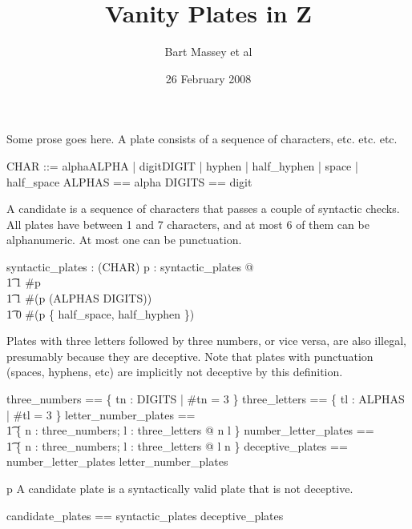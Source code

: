 \documentclass{article}
\title{Vanity Plates in Z}
\author{Bart Massey et al}
\date{26 February 2008}
\begin{document}
\maketitle

Some prose goes here.  A plate consists of a sequence of characters, etc. etc. etc.

\begin{zed}
   \also
  CHAR ::= alpha\ldata ALPHA \rdata | digit\ldata DIGIT \rdata | hyphen | half\_hyphen | space |
  half\_space \also
  ALPHAS == \ran alpha \also
  DIGITS == \ran digit
\end{zed}

A candidate is a sequence of characters that passes a couple of syntactic checks.  All plates have
between 1 and 7 characters, and at most 6 of them can be alphanumeric.  At most one can be
punctuation.

\begin{axdef}
  syntactic\_plates : \power (\seq CHAR)
  \where
  \forall p : syntactic\_plates @ \\
  \t1 1 \leq \#p  \land \\
  \t1 1 \leq \#(p \rres (ALPHAS \cup DIGITS))  \land \\
  \t1 0 \leq \#(p \rres \{ half\_space, half\_hyphen \}) 
\end{axdef}

Plates with three letters followed by three numbers, or vice versa, are also illegal, presumably
because they are deceptive.  Note that plates with punctuation (spaces, hyphens, etc) are implicitly
not deceptive by this definition.

\begin{zed}
  three\_numbers == \{ tn : \seq DIGITS | \#tn = 3 \} \also
  three\_letters == \{ tl : \seq ALPHAS | \#tl = 3 \} \also
  letter\_number\_plates == \\
  \t1 \{ n : three\_numbers; l : three\_letters @ n \cat l \}
  \also
  number\_letter\_plates == \\
  \t1 \{ n : three\_numbers; l : three\_letters @ l \cat n \}
  \also
  deceptive\_plates == number\_letter\_plates \cup letter\_number\_plates
\end{zed}
p
A candidate plate is a syntactically valid plate that is not deceptive.

\begin{zed}
  candidate\_plates == syntactic\_plates \setminus deceptive\_plates
\end{zed}
\end{document}
